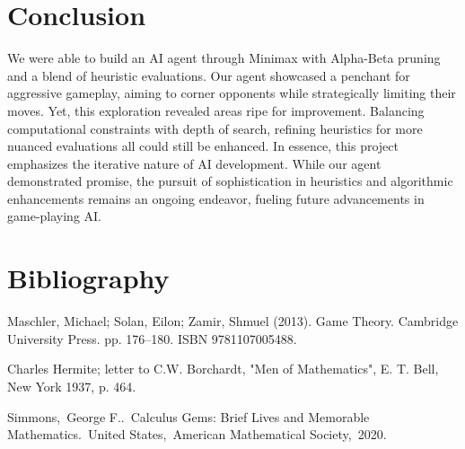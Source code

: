 \documentclass[11pt]{article}
\begin{document}
\section{Conclusion}

We were able to build an AI agent through Minimax with Alpha-Beta pruning and a blend of heuristic evaluations. Our agent showcased a penchant for aggressive gameplay, aiming to corner opponents while strategically limiting their moves.
Yet, this exploration revealed areas ripe for improvement. Balancing computational constraints with depth of search, refining heuristics for more nuanced evaluations all could still be enhanced.
In essence, this project emphasizes the iterative nature of AI development. While our agent demonstrated promise, the pursuit of sophistication in heuristics and algorithmic enhancements remains 
an ongoing endeavor, fueling future advancements in game-playing AI.





\pagebreak
\section*{Bibliography}

\begin{flushleft}
    Maschler, Michael; Solan, Eilon; Zamir, Shmuel (2013). Game Theory. Cambridge University Press. pp. 176–180. ISBN 9781107005488.
\end{flushleft}

\begin{flushleft}
    Charles Hermite; letter to C.W. Borchardt, "Men of Mathematics", E. T. Bell, New York 1937, p. 464.
\end{flushleft}

\begin{flushleft}
    Simmons, George F.. Calculus Gems: Brief Lives and Memorable Mathematics. United States, American Mathematical Society, 2020.
\end{flushleft}
\end{document}
